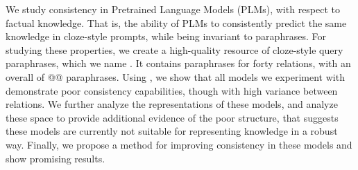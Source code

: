 We study consistency in Pretrained Language Models (PLMs), with respect to factual knowledge. That is, the ability of PLMs to consistently predict the same knowledge in cloze-style prompts, while being invariant to paraphrases.
For studying these properties, we create a high-quality resource of cloze-style query paraphrases, which we name \resource{}. It contains paraphrases for forty relations, with an overall of @@ paraphrases.
Using \resource{}, we show that all models we experiment with demonstrate poor consistency capabilities, though with high variance between relations.
We further analyze the representations of these models, and analyze these space to provide additional evidence of the poor structure, that suggests these models are currently not suitable for representing knowledge in a robust way.
Finally, we propose a method for improving consistency in these models and show promising results.
